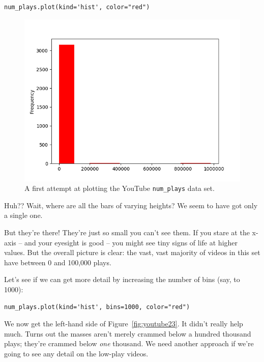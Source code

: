 \begin{Verbatim}[fontsize=\scriptsize,samepage=true,frame=single,framesep=3mm]
num_plays.plot(kind='hist', color="red")
\end{Verbatim}

\begin{figure}[ht]
\centering
\includegraphics[width=1\textwidth]{youtube1.png}
\caption{A first attempt at plotting the YouTube \texttt{num\_plays} data set.}
\label{fig:youtube1}
\end{figure}

Huh?? Wait, where are all the bars of varying heights? We seem to have got only
a single one.

But they're there! They're just so small you can't see them. If you stare at
the x-axis -- and your eyesight is good -- you might see tiny signs of life at
higher values. But the overall picture is clear: the vast, vast majority of
videos in this set have between 0 and 100,000 plays.


Let's see if we can get more detail by increasing the number of bins (say,
to 1000):

\begin{Verbatim}[fontsize=\scriptsize,samepage=true,frame=single,framesep=3mm]
num_plays.plot(kind='hist', bins=1000, color="red")
\end{Verbatim}

We now get the left-hand side of Figure~\ref{fig:youtube23}. It didn't really
help much. Turns out the masses aren't merely crammed below a hundred thousand
plays; they're crammed below \textit{one} thousand. We need another approach if
we're going to see any detail on the low-play videos.

